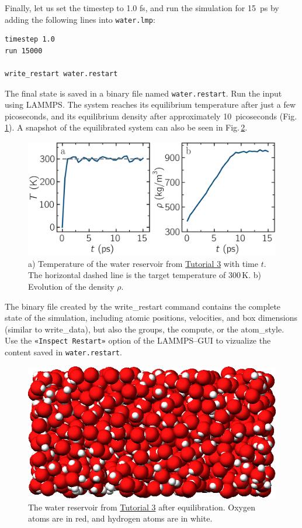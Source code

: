\documentclass[9pt,tutorial]{livecoms}
\newcommand{\lmpcmdnote}[1]{\hspace{0pt}\colorbox{note_listing}{\textcolor{command}{\small{#1}}}\hspace{0pt}} %
\newcommand{\flecmd}[1]{\textcolor{command}{\texttt{#1}}} %
\newcommand{\guicmd}[1]{\textcolor{command}{\texttt{«#1»}}} %
\begin{document}
Finally, let us set the timestep to 1.0 fs, and run the simulation for 15~ps by
adding the following lines into \flecmd{water.lmp}:
\begin{lstlisting}
timestep 1.0
run 15000

write_restart water.restart
\end{lstlisting}
The final state is saved in a binary file named \flecmd{water.restart}.
Run the input using LAMMPS.  The system reaches its equilibrium temperature
after just a few picoseconds, and its equilibrium density after approximately
10~picoseconds (Fig.\,\ref{fig:PEG-density}).  A snapshot of the equilibrated
system can also be seen in Fig.\,\ref{fig:PEG-water}.

\begin{figure}
\centering
\includegraphics[width=\linewidth]{PEG-density}
\caption{a) Temperature of the water reservoir from
\hyperref[all-atom-label]{Tutorial 3} with time $t$.  The horizontal dashed line is
the target temperature of 300\,K.  b) Evolution of the density $\rho$.}
\label{fig:PEG-density}
\end{figure}

\begin{note}
The binary file created by the \lmpcmdnote{write\_restart} command contains the
complete state of the simulation, including atomic positions, velocities, and
box dimensions (similar to \lmpcmdnote{write\_data}), but also the groups,
the compute, or the \lmpcmdnote{atom\_style}.  Use the \guicmd{Inspect Restart}
option of the LAMMPS--GUI to vizualize the content saved in \flecmd{water.restart}.
\end{note}

\begin{figure}
\centering
\includegraphics[width=\linewidth]{PEG-water}
\caption{The water reservoir from \hyperref[all-atom-label]{Tutorial 3}
after equilibration.  Oxygen atoms are in red, and hydrogen atoms are in white.}
\label{fig:PEG-water}
\end{figure}
\end{document}
